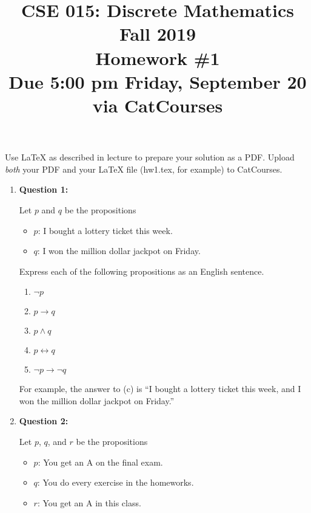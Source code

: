 \documentclass[11pt]{article}
\begin{document}
\title{CSE 015: Discrete Mathematics\\
Fall 2019\\
Homework \#1\\
Due 5:00 pm Friday, September 20 via CatCourses}

\date{}

\maketitle

\noindent Use LaTeX as described in lecture to prepare your solution as a PDF. Upload \emph{both} your PDF and your LaTeX file (hw1.tex, for example) to CatCourses.


\begin{enumerate}

\item
\textbf{Question 1:}

Let $p$ and $q$ be the propositions

\begin{itemize}
  \item[] $p$: I bought a lottery ticket this week.
  \item[] $q$: I won the million dollar jackpot on Friday.
\end{itemize}

Express each of the following propositions as an English sentence.

\begin{enumerate}[label=(\alph*)]
\item $\lnot p$
\item $p \rightarrow q$
\item $p \land q$
\item $p \leftrightarrow q$
\item $\lnot p \rightarrow \lnot q$
\end{enumerate}

For example, the answer to (c) is ``I bought a lottery ticket this week, and I won the million dollar jackpot on Friday.''

\item
\textbf{Question 2:}

Let $p$, $q$, and $r$ be the propositions

\begin{itemize}
  \item[] $p$: You get an A on the final exam.
  \item[] $q$: You do every exercise in the homeworks.
  \item[] $r$: You get an A in this class.
\end{itemize}


\end{enumerate}
\end{document}

